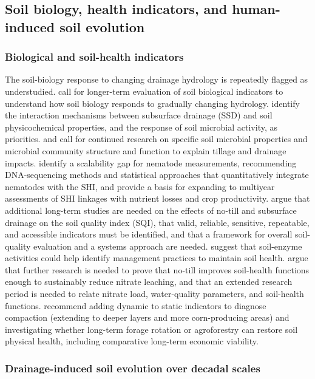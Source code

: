 \documentclass[11pt]{article}
\begin{document}
\subsection{Soil biology, health indicators, and human-induced soil evolution}

\subsubsection{Biological and soil-health indicators}

The soil-biology response to changing drainage hydrology is repeatedly flagged as understudied. \textcite{Sherbine2023} call for longer-term evaluation of soil biological indicators to understand how soil biology responds to gradually changing hydrology. \textcite{Yang2025} identify the interaction mechanisms between subsurface drainage (SSD) and soil physicochemical properties, and the response of soil microbial activity, as priorities. \textcite{Kaur2024b} and \textcite{Kumar2014} call for continued research on specific soil microbial properties and microbial community structure and function to explain tillage and drainage impacts. \textcite{Li2023b} identify a scalability gap for nematode measurements, recommending DNA-sequencing methods and statistical approaches that quantitatively integrate nematodes with the SHI, and provide a basis for expanding to multiyear assessments of SHI linkages with nutrient losses and crop productivity. \textcite{Nakajima2015} argue that additional long-term studies are needed on the effects of no-till and subsurface drainage on the soil quality index (SQI), that valid, reliable, sensitive, repeatable, and accessible indicators must be identified, and that a framework for overall soil-quality evaluation and a systems approach are needed. \textcite{Singh2007} suggest that soil-enzyme activities could help identify management practices to maintain soil health. \textcite{Masri2024} argue that further research is needed to prove that no-till improves soil-health functions enough to sustainably reduce nitrate leaching, and that an extended research period is needed to relate nitrate load, water-quality parameters, and soil-health functions. \textcite{Caron2025} recommend adding dynamic to static indicators to diagnose compaction (extending to deeper layers and more corn-producing areas) and investigating whether long-term forage rotation or agroforestry can restore soil physical health, including comparative long-term economic viability.

\subsubsection{Drainage-induced soil evolution over decadal scales}
\end{document}
